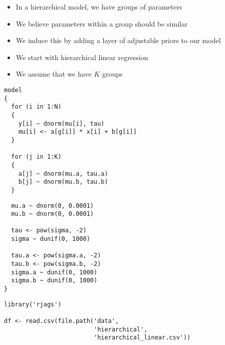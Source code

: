 \documentclass{beamer}
\begin{document}
\begin{frame}[fragile]
  \begin{itemize}
    \item{In a hierarchical model, we have groups of parameters}
    \item{We believe parameters within a group should be similar}
    \item{We induce this by adding a layer of adjustable priors to our model}
  \end{itemize}
\end{frame}


\begin{frame}
  \begin{itemize}
    \item{We start with hierarchical linear regression}
    \item{We assume that we have $K$ groups}
  \end{itemize}
\end{frame}

\begin{frame}[fragile]
  \begin{verbatim}
model
{
  for (i in 1:N)
  {
    y[i] ~ dnorm(mu[i], tau)
    mu[i] <- a[g[i]] * x[i] + b[g[i]]
  }
  
  for (j in 1:K)
  {
    a[j] ~ dnorm(mu.a, tau.a)
    b[j] ~ dnorm(mu.b, tau.b)
  }
  \end{verbatim}
\end{frame}

\begin{frame}[fragile]
  \begin{verbatim}
  mu.a ~ dnorm(0, 0.0001)
  mu.b ~ dnorm(0, 0.0001)

  tau <- pow(sigma, -2)
  sigma ~ dunif(0, 1000)

  tau.a <- pow(sigma.a, -2)
  tau.b <- pow(sigma.b, -2)
  sigma.a ~ dunif(0, 1000)
  sigma.b ~ dunif(0, 1000)
}
  \end{verbatim}
\end{frame}

\begin{frame}[fragile]
  \begin{verbatim}
library('rjags')

df <- read.csv(file.path('data',
                         'hierarchical',
                         'hierarchical_linear.csv'))
  \end{verbatim}
\end{frame}
\end{document}
